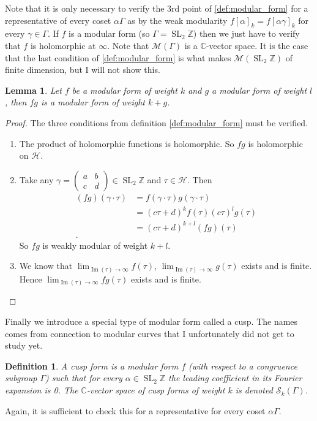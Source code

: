 \documentclass[titlepage,a4paper]{article}
\theoremstyle{theoremdd}
\newtheorem{lemma}[theorem]{Lemma}
\theoremstyle{definitiondd}
\newtheorem{definition}[theorem]{Definition}
\theoremstyle{remarkdd}
\newcommand{\Z}{\mathbb{Z}}
\newcommand{\C}{\mathbb{C}}
\DeclareMathOperator{\im}{Im}
\DeclareMathOperator{\SL}{SL}
\begin{document}
Note that it is only necessary to verify the 3rd point of \cref{def:modular_form} for a representative of every coset $\alpha \Gamma$ as by the weak modularity  $f[\alpha]_k = f[\alpha \gamma]_k$ for every  $\gamma \in \Gamma$. 
If  $f$ is a modular form (so $\Gamma = \SL_2\Z$) then we just have to verify that $f$ is holomorphic at $\infty$.
Note that $\mathcal{M}(\Gamma)$ is a $\C$-vector space. 
It is the case that the last condition of \cref{def:modular_form} is what makes $\mathcal{M} (\SL_2\Z)$ of finite dimension, but I will not show this. 
\begin{lemma}\label{lem:product_modular_forms}
	Let $f$ be a modular form of weight $k$ and $g$ a modular form of weight $l$, then 
	$fg$ is a modular form of weight  $k + g$.
\end{lemma}
\begin{proof}
	The three conditions from definition \ref{def:modular_form} must be verified. 
	\begin{enumerate}
		\item The product of holomorphic functions is holomorphic. So $ fg$ is holomorphic on $\mathcal{H} $. 
		\item Take any  $\gamma = \begin{pmatrix} a & b \\ c & d \end{pmatrix} \in \SL_2\Z$ and $\tau \in \mathcal{H} $. Then 
			\begin{align*}
				(fg)(\gamma \cdot \tau) &= f(\gamma \cdot \tau) g(\gamma \cdot \tau)   \\
							&= (c\tau + d)^{k} f(\tau) (c \tau)^{l} g(\tau) \\
							&= (c\tau + d)^{k+l} (fg)(\tau) \\
			.\end{align*}
			So $fg$ is weakly modular of weight $k+l$. 
		\item We know that $\lim_{\im(\tau) \to \infty} f(\tau)$, $\lim_{\im(\tau) \to \infty} g(\tau)$ exists and is finite. Hence $\lim_{\im(\tau) \to \infty} fg (\tau)$ exists and is finite.		
	\end{enumerate}
\end{proof}

Finally we introduce a special type of modular form called a cusp. The names comes from connection to modular curves that I unfortunately did not get to study yet.
\begin{definition}\label{def:cusp}
	A \emph{cusp form} is a modular form $f$ (with respect to a congruence subgroup  $\Gamma$) such that for every  $\alpha \in \SL_2\Z$  the leading coefficient in its Fourier expansion is 0. 
	 The $\C$-vector space of cusp forms of weight $k$ is denoted $\mathcal{S} _k(\Gamma)$.
\end{definition}
Again, it is sufficient to check this for a representative for every coset $\alpha \Gamma$.
\end{document}
